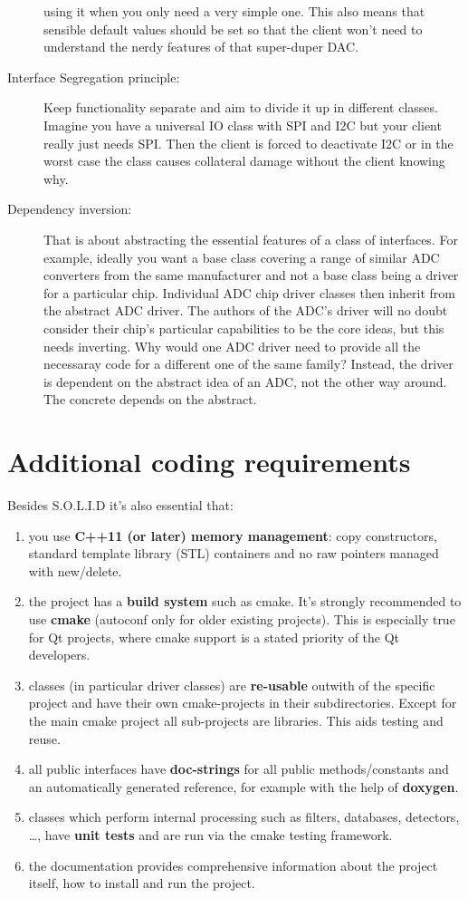 \documentclass[12pt]{report}
\begin{document}
\begin{description}
  using it when you only need a very simple one. This also means
  that sensible default values should be set so that the client
  won't need to understand the nerdy features of that super-duper DAC.
\item[Interface Segregation principle:]
  Keep functionality separate and aim to divide it up in different
  classes. Imagine you have a universal IO class with SPI and I2C
  but your client really just needs SPI. Then the client is forced
  to deactivate I2C or in the worst case the class causes collateral
  damage without the client knowing why.
\item[Dependency inversion:] That is about abstracting the
  essential features of a class of interfaces. For example, ideally
  you want a base class covering a range of similar
  ADC converters from the same manufacturer and not a base class being
  a driver for a particular chip. Individual ADC chip driver
  classes then inherit from the abstract ADC driver. The authors of
  the ADC's driver will no doubt consider their chip's
  particular capabilities to be the core ideas,
  but this needs inverting. Why would one ADC driver need
  to provide all the necessaray code for a different one of the
  same family? Instead, the driver is dependent on the abstract
  idea of an ADC, not the other way around. The concrete depends
  on the abstract.
\end{description}


\section{Additional coding requirements}
Besides S.O.L.I.D it's also essential that:
\begin{enumerate}
\item you use \textbf{C++11 (or later) memory management}: copy constructors, standard template library (STL) containers and no raw pointers
  managed with new/delete.
\item the project has a \textbf{build system} such as cmake. It's
  strongly recommended to use \textbf{cmake} (autoconf only for older existing
  projects). This is especially true for Qt projects, where cmake support
  is a stated priority of the Qt developers.
\item classes (in particular driver classes) are \textbf{re-usable}
  outwith of the specific project and have
  their own cmake-projects in their subdirectories. Except for the main
  cmake project all sub-projects are libraries. This aids testing and
  reuse.
\item all public interfaces have \textbf{doc-strings} for all public
  methods/constants and an automatically generated reference, for
  example with the help of \textbf{doxygen}.
\item classes which perform internal processing such as filters,
  databases, detectors, \ldots, have \textbf{unit tests} and are run via
  the cmake testing framework.
\item the documentation provides comprehensive information about the project itself,
  how to install and run the project.
\end{enumerate}
\end{document}
